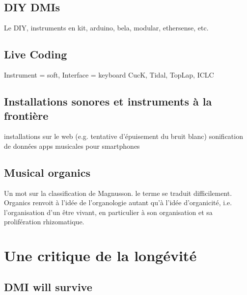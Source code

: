 \subsection{DIY DMIs}
Le \gls{DIY}, instruments en kit, arduino, bela, modular, ethersense, etc.

\subsection{Live Coding}
Instrument = soft, Interface = keyboard
CucK, Tidal, TopLap, \gls{ICLC}

\subsection{Installations sonores et instruments à la frontière}
installations sur le web (e.g. tentative d'épuisement du bruit blanc)
sonification de données
apps musicales pour smartphones

\subsection{Musical organics}
Un mot sur la classification de Magnusson.
le terme se traduit difficilement. Organics renvoit à l'idée de l'organologie autant qu'à l'idée d'organicité, i.e. l'organisation d'un être vivant, en particulier à son organisation et sa prolifération rhizomatique.

\section{Une critique de la longévité}
\label{sec:ephemerality:critique}

\subsection{DMI will survive}


